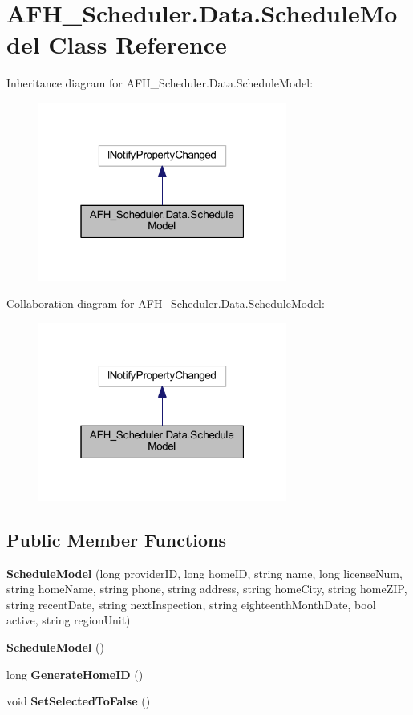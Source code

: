 \section{A\+F\+H\+\_\+\+Scheduler.\+Data.\+Schedule\+Model Class Reference}
\label{class_a_f_h___scheduler_1_1_data_1_1_schedule_model}


Inheritance diagram for A\+F\+H\+\_\+\+Scheduler.\+Data.\+Schedule\+Model\+:
\nopagebreak
\begin{figure}[H]
\begin{center}
\leavevmode
\includegraphics[width=232pt]{class_a_f_h___scheduler_1_1_data_1_1_schedule_model__inherit__graph}
\end{center}
\end{figure}


Collaboration diagram for A\+F\+H\+\_\+\+Scheduler.\+Data.\+Schedule\+Model\+:
\nopagebreak
\begin{figure}[H]
\begin{center}
\leavevmode
\includegraphics[width=232pt]{class_a_f_h___scheduler_1_1_data_1_1_schedule_model__coll__graph}
\end{center}
\end{figure}
\subsection*{Public Member Functions}
\begin{DoxyCompactItemize}
\item 
\textbf{ Schedule\+Model} (long provider\+ID, long home\+ID, string name, long license\+Num, string home\+Name, string phone, string address, string home\+City, string home\+Z\+IP, string recent\+Date, string next\+Inspection, string eighteenth\+Month\+Date, bool active, string region\+Unit)
\item 
\textbf{ Schedule\+Model} ()
\item 
long \textbf{ Generate\+Home\+ID} ()
\item 
void \textbf{ Set\+Selected\+To\+False} ()
\end{DoxyCompactItemize}
